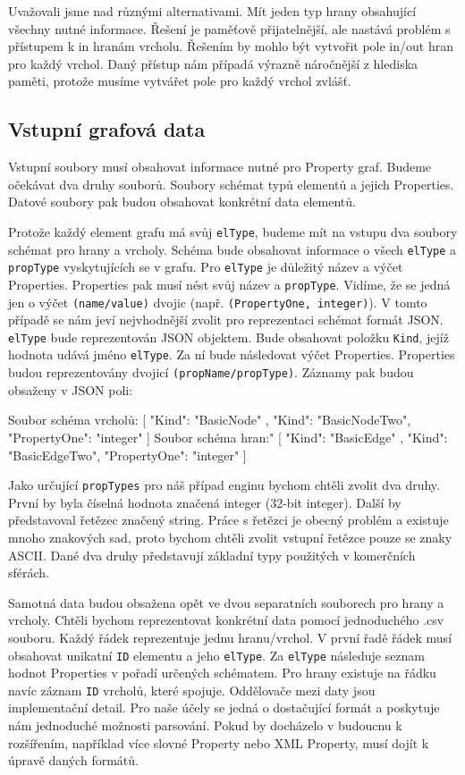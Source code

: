 Uvažovali jsme nad různými alternativami. 
Mít jeden typ hrany obsahující všechny nutné informace.
Řešení je paměťově přijatelnější, ale nastává problém s přístupem k in hranám vrcholu.
Řešením by mohlo být vytvořit pole in/out hran pro každý vrchol. 
Daný přístup nám případá výrazně náročnější z hlediska paměti, protože musíme vytvářet pole pro každý vrchol zvlášť. 

\subsection{Vstupní grafová data}

Vstupní soubory musí obsahovat informace nutné pro Property graf.
Budeme očekávat dva druhy souborů.
Soubory schémat typů elementů a jejich Properties.
Datové soubory pak budou obsahovat konkrétní data elementů.

Protože každý element grafu má svůj \verb+elType+, budeme mít na vstupu dva soubory schémat pro hrany a vrcholy.
Schéma bude obsahovat informace o všech \verb+elType+ a \verb+propType+ vyskytujících se v grafu.
Pro \verb+elType+ je důležitý název a výčet Properties.
Properties pak musí nést svůj název a \verb+propType+.
Vidíme, že se jedná jen o výčet \verb+(name/value)+ dvojic (např. \verb+(PropertyOne, integer)+).
V tomto případě se nám jeví nejvhodnější zvolit pro reprezentaci schémat formát JSON.
\verb+elType+ bude reprezentován JSON objektem. 
Bude obsahovat položku \verb+Kind+, jejíž hodnota udává jméno \verb+elType+.
Za ní bude následovat výčet Properties.
Properties budou reprezentovány dvojicí \verb+(propName/propType)+.
Záznamy pak budou obsaženy v JSON poli:
\begin{code}
Soubor schéma vrcholů:
[    { "Kind": "BasicNode" }, 
     { "Kind": "BasicNodeTwo", "PropertyOne": "integer" } ]
Soubor schéma hran:"
[    { "Kind": "BasicEdge" }, 
     { "Kind": "BasicEdgeTwo", "PropertyOne": "integer" } ]
\end{code}
Jako určující \verb+propTypes+ pro náš případ enginu bychom chtěli zvolit dva druhy.
První by byla číselná hodnota značená integer (32-bit integer).
Další by představoval řetězec značený string.
Práce s řetězci je obecný problém a existuje mnoho znakových sad, proto bychom chtěli zvolit vstupní řetězce pouze se znaky ASCII.  
Dané dva druhy představují základní typy použitých v komerčních sférách.

Samotná data budou obsažena opět ve dvou separatních souborech pro hrany a vrcholy.
Chtěli bychom reprezentovat konkrétní data pomocí jednoduchého .csv souboru.
Každý řádek reprezentuje jednu hranu/vrchol.
V první řadě řádek musí obsahovat unikatní \verb+ID+ elementu a jeho \verb+elType+. 
Za \verb+elType+ následuje seznam hodnot Properties v pořadí určených schématem.
Pro hrany existuje na řádku navíc záznam \verb+ID+ vrcholů, které spojuje.
Oddělovače mezi daty jsou implementační detail.
Pro naše účely se jedná o dostačující formát a poskytuje nám jednoduché možnosti parsování.
Pokud by docházelo v budoucnu k rozšířením, například více slovné Property nebo XML Property, musí dojít k úpravě daných formátů.

